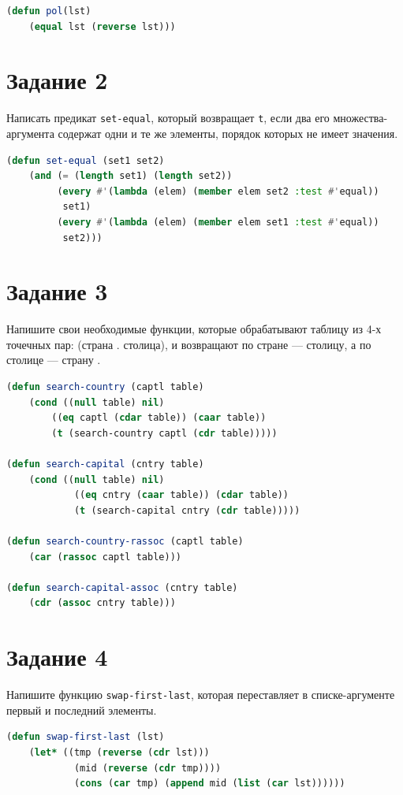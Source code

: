 \documentclass[12pt]{report}
\begin{document}
\begin{lstlisting}[language=Lisp]
	(defun pol(lst) 
	(equal lst (reverse lst)))
\end{lstlisting}


\section*{Задание 2}
Написать предикат \texttt{set-equal}, который возвращает \texttt{t}, если два его множества-аргумента содержат одни и те же элементы, порядок которых не имеет значения.

\begin{lstlisting}[language=Lisp]
(defun set-equal (set1 set2)
	(and (= (length set1) (length set2))
		 (every #'(lambda (elem) (member elem set2 :test #'equal)) 
		  set1)
		 (every #'(lambda (elem) (member elem set1 :test #'equal)) 
		  set2)))
\end{lstlisting}


\section*{Задание 3}
Напишите свои необходимые функции, которые обрабатывают таблицу из 4-х точечных пар: (страна . столица), и возвращают по стране --- столицу, а по столице --- страну .
    \begin{lstlisting}[language=Lisp]
(defun search-country (captl table)
	(cond ((null table) nil)
		((eq captl (cdar table)) (caar table))
		(t (search-country captl (cdr table)))))

(defun search-capital (cntry table)
	(cond ((null table) nil)
			((eq cntry (caar table)) (cdar table))
			(t (search-capital cntry (cdr table)))))
			
(defun search-country-rassoc (captl table)
	(car (rassoc captl table)))

(defun search-capital-assoc (cntry table)
	(cdr (assoc cntry table)))
    \end{lstlisting}


\section*{Задание 4}
Напишите функцию \texttt{swap-first-last}, которая переставляет в списке-аргументе первый и последний элементы.
\begin{lstlisting}[language=Lisp]
(defun swap-first-last (lst)
	(let* ((tmp (reverse (cdr lst)))
			(mid (reverse (cdr tmp))))
			(cons (car tmp) (append mid (list (car lst))))))
\end{lstlisting}
\end{document}
